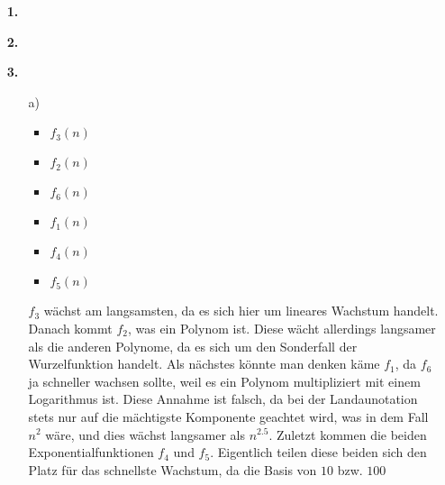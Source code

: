 \documentclass[a4paper,11pt]{article}
\title{\titleinfo}
\author{\authorinfotitle}
\date{\today}
\begin{document}
\maketitle
    \begin{enumerate}

            \item[\textbf{1.}]

            \item[\textbf{2.}]


            \item[\textbf{3.}]
                \begin{enumerate}
                    \item[a)]
                        \begin{itemize}
                            \item $f_3(n)$\\
                            \item $f_2(n)$\\
                            \item $f_6(n)$\\
                            \item $f_1(n)$\\
                            \item $f_4(n)$\\
                            \item $f_5(n)$\\
                        \end{itemize}
                        $f_3$ wächst am langsamsten, da es sich hier um lineares
                        Wachstum handelt. Danach kommt $f_2$, was ein Polynom ist.
                        Diese wächt allerdings langsamer als die anderen Polynome,
                        da es sich um den Sonderfall der Wurzelfunktion handelt.
                        Als nächstes könnte man denken käme $f_1$, da $f_6$ ja
                        schneller wachsen sollte, weil es ein Polynom multipliziert
                        mit einem Logarithmus ist. Diese Annahme ist falsch,
                        da bei der Landaunotation stets nur auf die mächtigste
                        Komponente geachtet wird, was in dem Fall $n^2$ wäre, und
                        dies wächst langsamer als $n^{2.5}$. Zuletzt kommen
                        die beiden Exponentialfunktionen $f_4$ und $f_5$.
                        Eigentlich teilen diese beiden sich den Platz für das
                        schnellste Wachstum, da die Basis von $10$ bzw. $100$

\end{enumerate}
\end{enumerate}
\end{document}
